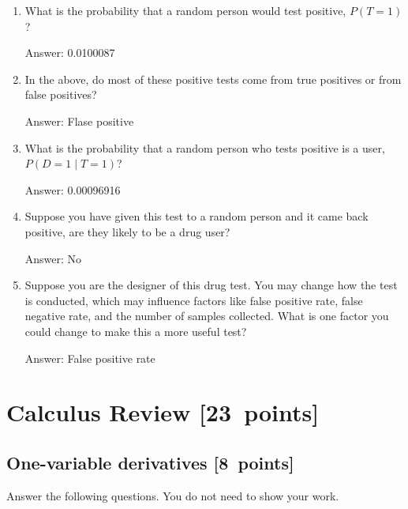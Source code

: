 \documentclass{article}
\newcommand{\blu}[1]{{\textcolor{blu}{#1}}}
\newenvironment{answer}{\par\begingroup\color{gre}Answer: }{\endgroup}
\let\ask\blu
\newcommand\pts[1]{\textcolor{pointscolour}{[#1~points]}}
\begin{document}
  \begin{enumerate}
  \item What is the probability that a random person would test positive, $P(T=1)$?
  \begin{answer}
    0.0100087
  \end{answer}
  \item In the above, do most of these positive tests come from true positives or from false positives?
  \begin{answer}
    Flase positive
  \end{answer}
  \item What is the probability that a random person who tests positive is a user, $P(D=1 \mid T=1)$?
  \begin{answer}
    0.00096916
  \end{answer}
  \item Suppose you have given this test to a random person and it came back positive, are they likely to be a drug user?
  \begin{answer}
    No
  \end{answer}
  \item Suppose you are the designer of this drug test. You may change how the test is conducted, which may influence factors like false positive rate, false negative rate, and the number of samples collected. What is one factor you could change to make this a more useful test?
  \begin{answer}
    False positive rate
  \end{answer}
  \end{enumerate}


  \clearpage
  \section{Calculus Review \pts{23}}



  \subsection{One-variable derivatives \pts{8}}
  \label{sub.one.var}

  \ask{Answer the following questions.} You do not need to show your work.
\end{document}
